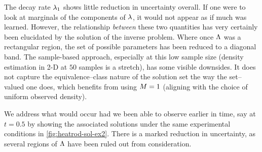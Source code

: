 The decay rate $\lambda_1$ shows little reduction in uncertainty overall.
If one were to look at marginals of the components of $\lambda$, it would not appear as if much was learned.
However, the relationship \emph{between} these two quantities has very certainly been elucidated by the solution of the inverse problem.
Where once ${\Lambda}$ was a rectangular region, the set of possible parameters has been reduced to a diagonal band.
The sample-based approach, especially at this low sample size (density estimation in 2-D at $50$ samples is a stretch), has some visible downsides.
It does not capture the equivalence--class nature of the solution set the way the set--valued one does, which benefits from using $M=1$ (aligning with the choice of uniform observed density).


We address what would occur had we been able to observe earlier in time, say at $t=0.5$ by showing the associated solutions under the same experimental conditions in \ref{fig:heatrod-sol-ex2}.
There is a marked reduction in uncertainty, as several regions of ${\Lambda}$ have been ruled out from consideration.


